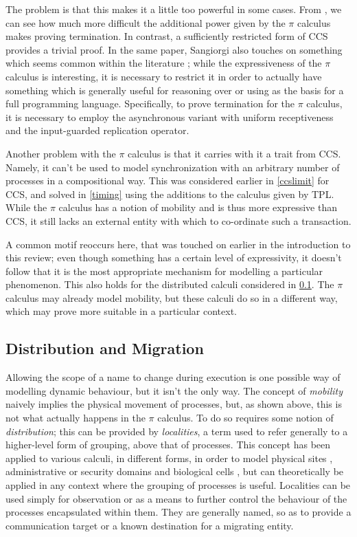 The problem is that this makes it a little too powerful in some cases.
From \cite{sangiorgi:types-or}, we can see how much more difficult the
additional power given by the $\pi$ calculus makes proving
termination.  In contrast, a sufficiently restricted form of CCS
provides a trivial proof.  In the same paper, Sangiorgi also touches
on something which seems common within the literature
\cite{join,stefani:kells,wojciechowski:phd,failure2}; while the
expressiveness of the $\pi$ calculus is interesting, it is necessary
to restrict it in order to actually have something which is generally
useful for reasoning over or using as the basis for a full programming
language.  Specifically, to prove termination for the $\pi$ calculus,
it is necessary to employ the asynchronous variant with uniform
receptiveness and the input-guarded replication operator.

Another problem with the $\pi$ calculus is that it carries with it a
trait from CCS.  Namely, it can't be used to model synchronization
with an arbitrary number of processes in a compositional way.  This
was considered earlier in \ref{ccslimit} for CCS, and solved in
\ref{timing} using the additions to the calculus given by TPL.  While
the $\pi$ calculus has a notion of mobility and is thus more
expressive than CCS, it still lacks an external entity with which to
co-ordinate such a transaction.  

A common motif reoccurs here, that was touched on earlier in the
introduction to this review; even though something has a certain level
of expressivity, it doesn't follow that it is the most appropriate
mechanism for modelling a particular phenomenon.  This also holds for
the distributed calculi considered in \ref{migration}.  The $\pi$
calculus may already model mobility, but these calculi do so in a
different way, which may prove more suitable in a particular context.
 
\subsection{Distribution and Migration}
\label{migration}

Allowing the scope of a name to change during execution is one possible
way of modelling dynamic behaviour, but it isn't the only way.  The
concept of \emph{mobility} naively implies the physical movement of
processes, but, as shown above, this is not what actually happens in the
$\pi$ calculus.  To do so requires some notion of \emph{distribution};
this can be provided by \emph{localities}, a term used to refer
generally to a higher-level form of grouping, above that of processes.
This concept has been applied to various calculi, in different forms, in
order to model physical sites \cite{wojciechowski:phd}, administrative
or security domains \cite{amb,seal} and biological cells \cite{brane04},
but can theoretically be applied in any context where the grouping of
processes is useful.  Localities can be used simply for observation or
as a means to further control the behaviour of the processes
encapsulated within them.  They are generally named, so as to provide a
communication target or a known destination for a migrating entity.

